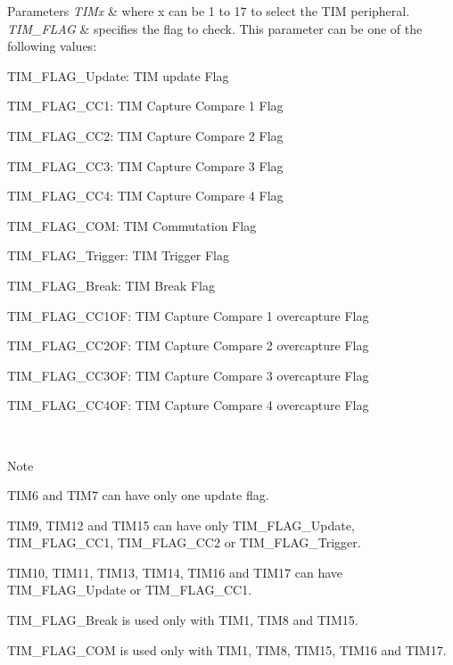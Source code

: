 \begin{DoxyParams}{Parameters}
{\em T\+I\+Mx} & where x can be 1 to 17 to select the T\+IM peripheral. \\
\hline
{\em T\+I\+M\+\_\+\+F\+L\+AG} & specifies the flag to check. This parameter can be one of the following values\+: \begin{DoxyItemize}
\item T\+I\+M\+\_\+\+F\+L\+A\+G\+\_\+\+Update\+: T\+IM update Flag \item T\+I\+M\+\_\+\+F\+L\+A\+G\+\_\+\+C\+C1\+: T\+IM Capture Compare 1 Flag \item T\+I\+M\+\_\+\+F\+L\+A\+G\+\_\+\+C\+C2\+: T\+IM Capture Compare 2 Flag \item T\+I\+M\+\_\+\+F\+L\+A\+G\+\_\+\+C\+C3\+: T\+IM Capture Compare 3 Flag \item T\+I\+M\+\_\+\+F\+L\+A\+G\+\_\+\+C\+C4\+: T\+IM Capture Compare 4 Flag \item T\+I\+M\+\_\+\+F\+L\+A\+G\+\_\+\+C\+OM\+: T\+IM Commutation Flag \item T\+I\+M\+\_\+\+F\+L\+A\+G\+\_\+\+Trigger\+: T\+IM Trigger Flag \item T\+I\+M\+\_\+\+F\+L\+A\+G\+\_\+\+Break\+: T\+IM Break Flag \item T\+I\+M\+\_\+\+F\+L\+A\+G\+\_\+\+C\+C1\+OF\+: T\+IM Capture Compare 1 overcapture Flag \item T\+I\+M\+\_\+\+F\+L\+A\+G\+\_\+\+C\+C2\+OF\+: T\+IM Capture Compare 2 overcapture Flag \item T\+I\+M\+\_\+\+F\+L\+A\+G\+\_\+\+C\+C3\+OF\+: T\+IM Capture Compare 3 overcapture Flag \item T\+I\+M\+\_\+\+F\+L\+A\+G\+\_\+\+C\+C4\+OF\+: T\+IM Capture Compare 4 overcapture Flag \end{DoxyItemize}
\\
\hline
\end{DoxyParams}
\begin{DoxyNote}{Note}

\begin{DoxyItemize}
\item T\+I\+M6 and T\+I\+M7 can have only one update flag.
\item T\+I\+M9, T\+I\+M12 and T\+I\+M15 can have only T\+I\+M\+\_\+\+F\+L\+A\+G\+\_\+\+Update, T\+I\+M\+\_\+\+F\+L\+A\+G\+\_\+\+C\+C1, T\+I\+M\+\_\+\+F\+L\+A\+G\+\_\+\+C\+C2 or T\+I\+M\+\_\+\+F\+L\+A\+G\+\_\+\+Trigger.
\item T\+I\+M10, T\+I\+M11, T\+I\+M13, T\+I\+M14, T\+I\+M16 and T\+I\+M17 can have T\+I\+M\+\_\+\+F\+L\+A\+G\+\_\+\+Update or T\+I\+M\+\_\+\+F\+L\+A\+G\+\_\+\+C\+C1.
\item T\+I\+M\+\_\+\+F\+L\+A\+G\+\_\+\+Break is used only with T\+I\+M1, T\+I\+M8 and T\+I\+M15.
\item T\+I\+M\+\_\+\+F\+L\+A\+G\+\_\+\+C\+OM is used only with T\+I\+M1, T\+I\+M8, T\+I\+M15, T\+I\+M16 and T\+I\+M17. 
\end{DoxyItemize}
\end{DoxyNote}

